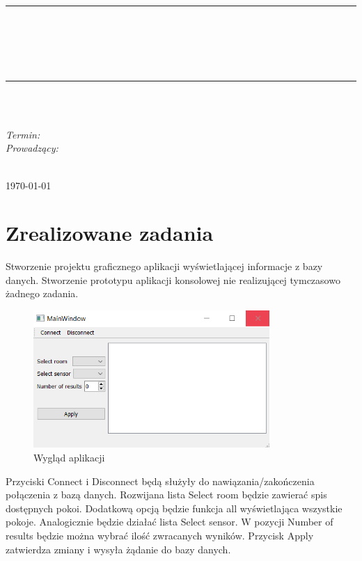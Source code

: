 \documentclass[10pt, a4paper]{article}
\begin{document}
\def\tablename{Tabela}	%

\begin{titlepage}
	\begin{center}
		\textsc{\LARGE \formakursu}\\[1cm]		
		\textsc{\Large \kurs}\\[0.5cm]		
		\rule{\textwidth}{0.08cm}\\[0.4cm]
		{\huge \bfseries \doctype}\\[1cm]
		{\huge \bfseries \projectname}\\[0.5cm]
		{\huge \bfseries \acronim}\\[0.4cm]
		\rule{\textwidth}{0.08cm}\\[1cm]
		
		\begin{flushright} \large
		\osobaA\\[0.4cm]

		
		\emph{Termin: }\termin\\[0.4cm]

		\emph{Prowadzący:} \\
		\prowadzacy \\
		
		\end{flushright}
		
		\vfill
		
		{\large \today}
	\end{center}	
\end{titlepage}


\section{Zrealizowane zadania}
	Stworzenie projektu graficznego aplikacji wyświetlającej informacje z bazy danych. Stworzenie prototypu aplikacji konsolowej nie realizującej tymczasowo żadnego zadania.
	\begin{figure}[H]
		\centering
		\includegraphics[width=0.8\textwidth]{figures/okno.png}
		\caption{Wygląd aplikacji}
	\end{figure}
	Przyciski Connect i Disconnect będą służyły do nawiązania/zakończenia połączenia z bazą danych. Rozwijana lista Select room będzie zawierać spis dostępnych pokoi. Dodatkową opcją będzie funkcja all wyświetlająca wszystkie pokoje. Analogicznie będzie działać lista Select sensor. W pozycji Number of results będzie można wybrać ilość zwracanych wyników. Przycisk Apply zatwierdza zmiany i wysyła żądanie do bazy danych.
\end{document}
